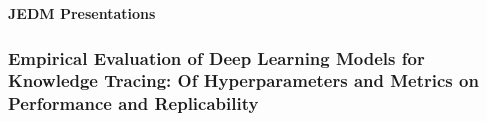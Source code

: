 \documentclass[letterpaper,11pt,oneside]{book} %
\begin{document}

\begin{center}
  {\Large \bf JEDM Presentations}
\end{center}

\vspace*{0.5cm}

\hypertarget{empirical-evaluation-of-deep-learning-models-for-knowledge-tracing-of-hyperparameters-and-metrics-on-performance-and-replicability}{%
\subsubsection{Empirical Evaluation of Deep Learning Models for
Knowledge Tracing: Of Hyperparameters and Metrics on Performance and
Replicability}\label{empirical-evaluation-of-deep-learning-models-for-knowledge-tracing-of-hyperparameters-and-metrics-on-performance-and-replicability}}
\end{document}
